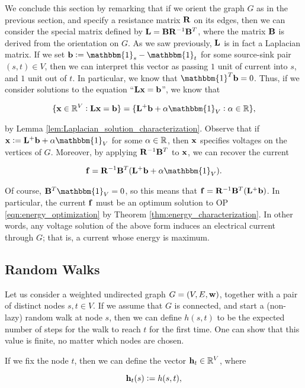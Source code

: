 \documentclass[11pt]{article}
\begin{document}
We conclude this section by remarking that if we orient the graph $G$
as in the previous section, and specify a resistance matrix $\V{R}$ on its edges,
then we can consider the special matrix defined by $\V{L} = \V{B}\V{R}^{-1}\V{B}^{T}$,
where the matrix $\V{B}$ is derived from the orientation on $G$. As we saw previously, $\V{L}$ is in fact a Laplacian matrix.
If we set $\V{b}:= \mathbbm{1}_{s} - \mathbbm{1}_{t}$ for some source-sink pair $(s,t) \in V$, then we can interpret
this vector as passing $1$ unit of current into $s$, and $1$ unit out of $t$. In particular, we know that $\mathbbm{1}^{T} \V{b}=0$.
Thus, if we consider solutions to the equation ``$\V{Lx}=\V{b}$'', we know that 

\[
	\{ \V{x} \in \rea^{V}: \V{Lx}=\V{b}\} = \{\V{L}^{+}\V{b}+ \alpha \mathbbm{1}_{V}: \alpha \in \rea\},
\]

by Lemma \ref{lem:Laplacian_solution_characterization}. Observe that if $\V{x} := \V{L}^{+}\V{b}+ \alpha \mathbbm{1}_{V}$
for some $\alpha \in \mathbb R$, then $\V{x}$ specifies voltages on the vertices of $G$. Moreover, by applying $\V{R}^{-1}\V{B}^{T}$
to $\V{x}$, we can recover the current 

\[
	\V{f} = \V{R}^{-1}\V{B}^{T}(\V{L}^{+}\V{b}+ \alpha \mathbbm{1}_{V}).
\]

Of course, $\V{B}^{T}\mathbbm{1}_{V}=0$, so this means that $\V{f}=\V{R}^{-1}\V{B}^{T}(\V{L}^{+}\V{b})$. 
In particular, the current $\V{f}$ must be an optimum solution to OP \ref{eqn:energy_optimization} by Theorem
\ref{thm:energy_characterization}. In other words, any voltage solution of the above form induces an electrical current
through $G$; that is, a current whose energy is maximum.

\subsection{Random Walks}

Let us consider a weighted undirected graph $G=(V,E,\V{w})$, together with a pair of distinct
nodes $s,t \in V$. If we assume that $G$ is connected, and start a (non-lazy) random walk
at node $s$, then we can define $h(s,t)$ to be the expected number of steps
for the walk to reach $t$ for the first time. One can show that this value is finite,
no matter which nodes are chosen.

If we fix the node $t$, then we can define the vector $\V{h}_{t} \in \rea^{V}$,
where

\[
	\V{h}_{t}(s):=h(s,t),
\]
\end{document}
